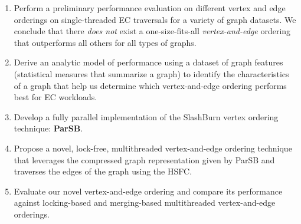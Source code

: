 \begin{enumerate}
  \item {Perform a preliminary performance evaluation on different vertex and edge orderings on single-threaded \ac{EC} traversals for a variety of graph datasets. We conclude that there \textit{does not} exist a one-size-fits-all \textit{vertex-and-edge} ordering that outperforms all others for all types of graphs.}
  \item {Derive an analytic model of performance using a dataset of graph features (statistical measures that summarize a graph) to identify the characteristics of a graph that help us determine which vertex-and-edge ordering performs best for \ac{EC} workloads.}
  \item {Develop a fully parallel implementation of the SlashBurn vertex ordering technique: \textbf{ParSB}.}
  \item {Propose a novel, lock-free, multithreaded vertex-and-edge ordering technique that leverages the compressed graph representation given by ParSB and traverses the edges of the graph using the \ac{HSFC}.}
  \item {Evaluate our novel vertex-and-edge ordering and compare its performance against locking-based and merging-based multithreaded vertex-and-edge orderings.}
\end{enumerate}